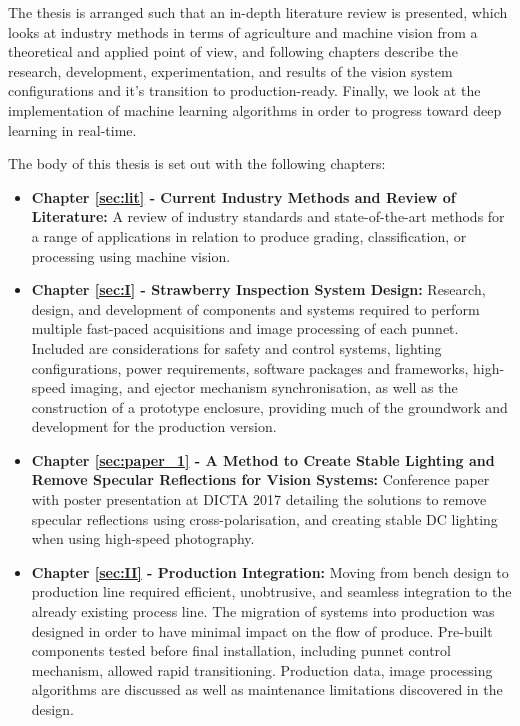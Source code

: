 \documentclass[fleqn,twoside,12pt]{report}
\begin{document}
The thesis is arranged such that an in-depth literature review is presented, which looks at industry methods in terms of agriculture and machine vision from a theoretical and applied point of view, and following chapters describe the research, development, experimentation, and results of the vision system configurations and it's transition to production-ready. Finally, we look at the implementation of machine learning algorithms in order to progress toward deep learning in real-time.  

The body of this thesis is set out with the following chapters: 


\begin{itemize}
	\item \textbf{Chapter \ref{sec:lit} - Current Industry Methods and Review of Literature:} A review of industry standards and state-of-the-art methods for a range of applications in relation to produce grading, classification, or processing using machine vision. 
	
	\item \textbf{Chapter \ref{sec:I} - Strawberry Inspection System Design:} Research, design, and development of components and systems required to perform multiple fast-paced acquisitions and image processing of each punnet. Included are considerations for  safety and control systems, lighting configurations, power requirements, software packages and frameworks, high-speed imaging, and ejector mechanism synchronisation, as well as the construction of a prototype enclosure, providing much of the groundwork and development for the production version. 
	
	\item \textbf{Chapter \ref{sec:paper_1} - A Method to Create Stable Lighting and Remove Specular Reflections for Vision Systems:} Conference paper with poster presentation at DICTA 2017 detailing the solutions to remove specular reflections using cross-polarisation, and creating stable DC lighting when using high-speed photography.
	
	\item \textbf{Chapter \ref{sec:II} - Production Integration:} Moving from bench design to production line required efficient, unobtrusive, and seamless integration to the already existing process line. The migration of systems into production was designed in order to have minimal impact on the flow of produce. Pre-built components tested before final installation, including punnet control mechanism, allowed rapid transitioning. Production data, image processing algorithms are discussed as well as maintenance limitations discovered in the design.
	

\end{itemize}
\end{document}
